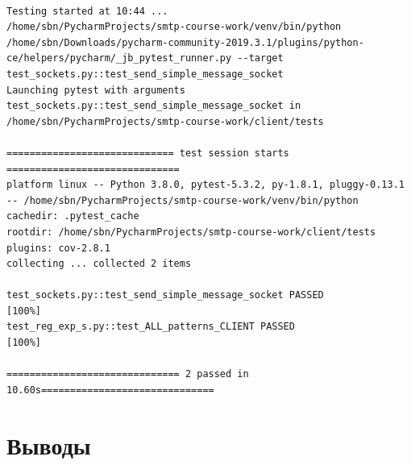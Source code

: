 \documentclass[a4paper,12pt]{report}
\begin{document}
\begin{verbatim}

Testing started at 10:44 ...
/home/sbn/PycharmProjects/smtp-course-work/venv/bin/python /home/sbn/Downloads/pycharm-community-2019.3.1/plugins/python-ce/helpers/pycharm/_jb_pytest_runner.py --target test_sockets.py::test_send_simple_message_socket
Launching pytest with arguments test_sockets.py::test_send_simple_message_socket in /home/sbn/PycharmProjects/smtp-course-work/client/tests

============================= test session starts ==============================
platform linux -- Python 3.8.0, pytest-5.3.2, py-1.8.1, pluggy-0.13.1 -- /home/sbn/PycharmProjects/smtp-course-work/venv/bin/python
cachedir: .pytest_cache
rootdir: /home/sbn/PycharmProjects/smtp-course-work/client/tests
plugins: cov-2.8.1
collecting ... collected 2 items

test_sockets.py::test_send_simple_message_socket PASSED                      [100%]
test_reg_exp_s.py::test_ALL_patterns_CLIENT PASSED                      [100%]

============================== 2 passed in 10.60s==============================

\end{verbatim}
\chapter*{Выводы}
\end{document}
